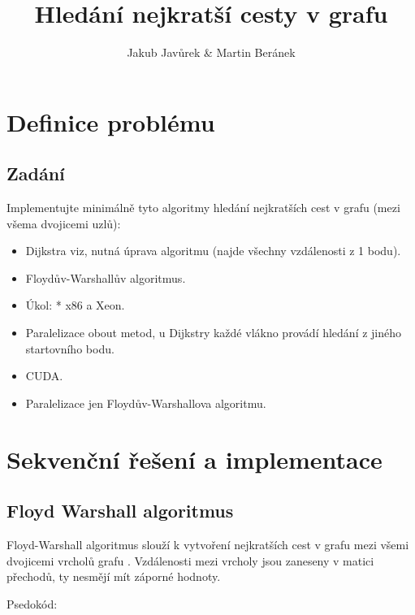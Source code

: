 \documentclass[10pt,a4paper]{article}
\begin{document}
\title{Hledání nejkratší cesty v grafu}
\author{Jakub Javůrek \& Martin Beránek}
\maketitle
\newpage
\tableofcontents
\listoffigures

\newpage

\section{Definice problému}

\subsection{Zadání}

Implementujte minimálně tyto algoritmy hledání nejkratších cest v grafu (mezi všema dvojicemi uzlů):
\begin{itemize}
    \item Dijkstra viz, nutná úprava algoritmu (najde všechny vzdálenosti z 1 bodu).
    \item Floydův-Warshallův algoritmus.
    \item Úkol: * x86 a Xeon.
\end{itemize}

\begin{itemize}
    \item Paralelizace obout metod, u Dijkstry každé vlákno provádí hledání z jiného startovního bodu.
    \item CUDA.
    \item Paralelizace jen Floydův-Warshallova algoritmu.
\end{itemize}

\section{Sekvenční řešení a implementace}

\subsection{Floyd Warshall algoritmus}

Floyd-Warshall algoritmus slouží k vytvoření nejkratších cest v grafu mezi všemi dvojicemi vrcholů grafu \cite{floydWarsh}. Vzdálenosti mezi vrcholy jsou zaneseny v matici přechodů, ty nesmějí mít záporné hodnoty.

Psedokód:
\end{document}
